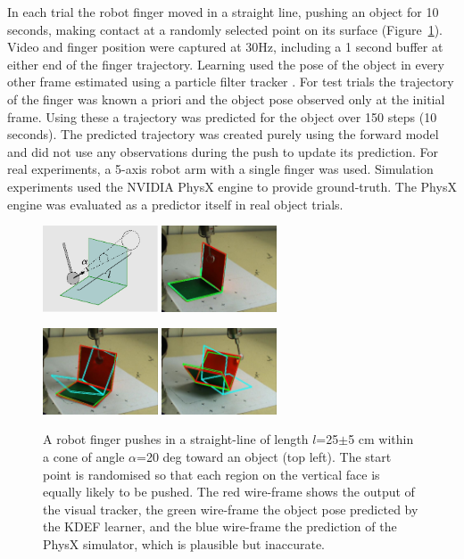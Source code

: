 In each trial the robot finger moved in a straight line, pushing
an object for 10 seconds, making contact at a randomly selected point
on its surface (Figure~\ref{fig:Setup}). Video and finger position were captured at 30Hz, including a 1 second buffer at either end of the finger trajectory. Learning used the pose of the object in every other frame estimated using a particle filter tracker \cite{morwald_edge_2009}. For test trials the trajectory of the finger was known a priori and the object pose observed only at the initial frame. Using these a trajectory was predicted for the object over 150 steps (10 seconds). The predicted trajectory was created purely using the forward model and did not use any observations during the push to update its prediction. For real experiments, a 5-axis robot arm with a single finger was used. Simulation experiments used the NVIDIA PhysX engine to provide ground-truth. The PhysX engine was evaluated as a predictor itself in real object trials.

\begin{figure}[t]
\centerline{
\includegraphics[width=3.4cm]{training}
\includegraphics[width=3.4cm]{complex1}
}
\centerline{
\includegraphics[width=3.4cm]{complex2}
\includegraphics[width=3.4cm]{complex4}
}
\caption[Setup]{
A robot finger pushes in a straight-line of length $l$=25$\pm$5 cm within a cone of angle $\alpha$=20 deg toward an object (top left). The start point is randomised so that each region on the vertical face is equally likely to be pushed. The red wire-frame shows the output of the visual tracker, the green wire-frame the object pose predicted by the KDEF learner, and the blue wire-frame the prediction of the PhysX simulator, which is plausible but inaccurate.}
\label{fig:Setup}
\end{figure}

